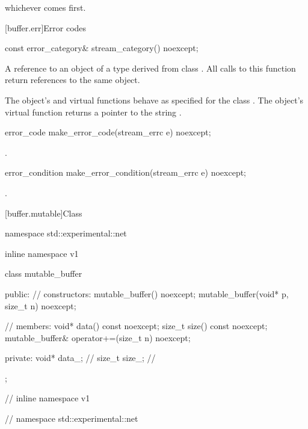 whichever comes first.




%
[buffer.err]{Error codes}

%
\begin{itemdecl}
const error_category& stream_category() noexcept;
\end{itemdecl}

\begin{itemdescr}
\pnum
\returns A reference to an object of a type derived from class . All calls to this function return references to the same object.

\pnum
The object's  and  virtual functions behave as specified for the class . The object's  virtual function returns a pointer to the string .
\end{itemdescr}

%
\begin{itemdecl}
error_code make_error_code(stream_errc e) noexcept;
\end{itemdecl}

\begin{itemdescr}
\pnum
\returns {}.
\end{itemdescr}

%
\begin{itemdecl}
error_condition make_error_condition(stream_errc e) noexcept;
\end{itemdecl}

\begin{itemdescr}
\pnum
\returns {}.
\end{itemdescr}



[buffer.mutable]{Class }

%
\begin{codeblock}
namespace std::experimental::net {
inline namespace v1 {

  class mutable_buffer
  {
  public:
    // constructors:
    mutable_buffer() noexcept;
    mutable_buffer(void* p, size_t n) noexcept;

    // members:
    void* data() const noexcept;
    size_t size() const noexcept;
    mutable_buffer& operator+=(size_t n) noexcept;

  private:
    void* data_; // \expos
    size_t size_; // \expos
  };

} // inline namespace v1
} // namespace std::experimental::net
\end{codeblock}


